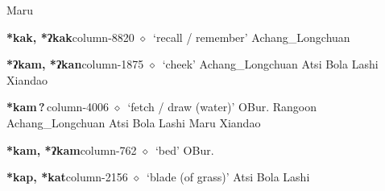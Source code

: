 \hspace{1ex}
         Maru 
  \item {\footnotesize \textbf{*kak, *ʔkak}}{\tiny column-8820}
         $\diamond$~`recall / remember'
         Achang\_Longchuan 
  \item {\footnotesize \textbf{*ʔkam, *ʔkan}}{\tiny column-1875}
         $\diamond$~`cheek'
         Achang\_Longchuan 
\hspace{1ex}
         Atsi 
\hspace{1ex}
         Bola 
\hspace{1ex}
         Lashi 
\hspace{1ex}
         Xiandao 
  \item {\footnotesize \textbf{*kam\,?\,}}{\tiny column-4006}
         $\diamond$~`fetch / draw (water)'
         OBur. 
\hspace{1ex}
         Rangoon 
\hspace{1ex}
         Achang\_Longchuan 
\hspace{1ex}
         Atsi 
\hspace{1ex}
         Bola 
\hspace{1ex}
         Lashi 
\hspace{1ex}
         Maru 
\hspace{1ex}
         Xiandao 
  \item {\footnotesize \textbf{*kam, *ʔkam}}{\tiny column-762}
         $\diamond$~`bed'
         OBur. 
  \item {\footnotesize \textbf{*kap, *kat}}{\tiny column-2156}
         $\diamond$~`blade (of grass)'
         Atsi 
\hspace{1ex}
         Bola 
\hspace{1ex}
         Lashi 
\hspace{1ex}
